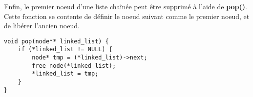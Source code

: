 Enfin, le premier noeud d'une liste chaînée peut être supprimé à l'aide de \textbf{pop()}. Cette fonction se contente de définir le noeud suivant comme le premier noeud, et de libérer l'ancien noeud.

\begin{lstlisting}[caption={pop(), supression du premier noeud}]
void pop(node** linked_list) {
    if (*linked_list != NULL) {
        node* tmp = (*linked_list)->next;
        free_node(*linked_list);
        *linked_list = tmp;
    }
}
\end{lstlisting}
